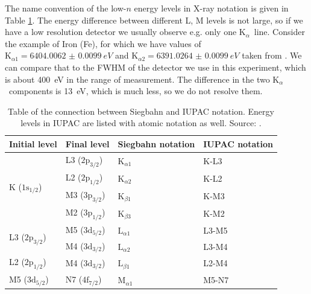 \documentclass[11pt,a4paper,twoside,onecolumn]{article}
\newcommand{\Kalpha}{$\mathrm{K}_\alpha$~}
\begin{document}
The name convention of the low-$n$ energy levels in X-ray notation is given in Table \ref{tab:siegbahn-notation}. The energy difference between different L, M levels is not large, so if we have a low resolution detector we usually observe e.g. only one \Kalpha line. Consider the example of Iron (Fe), for which we have values of $\mathrm{K}_{\alpha 1} = \qty{6404.0062(99)}{eV}$ and $\mathrm{K}_{\alpha 2} = \qty{6391.0264(99)}{eV}$ taken from \cite{Hudson2003}. We can compare that to the FWHM of the detector we use in this experiment, which is about \qty{400}{eV} in the range of measurement. The difference in the two \Kalpha components is \qty{13}{eV}, which is much less, so we do not resolve them.
\begin{table}[!htbp]
    \centering
    \begin{tabular}{@{}llll@{}}
    \toprule
    \multicolumn{1}{c}{Initial level} & \multicolumn{1}{c}{Final level} & \multicolumn{1}{c}{Siegbahn notation} & \multicolumn{1}{c}{IUPAC notation} \\ \midrule
    \multirow{4}{*}{K ($1\mathrm{s}_{1/2}$)}  & L3 ($2\mathrm{p}_{3/2}$) & $\mathrm{K}_{\alpha 1}$ & K-L3  \\
                                              & L2 ($2\mathrm{p}_{1/2}$) & $\mathrm{K}_{\alpha 2}$ & K-L2  \\
                                              & M3 ($3\mathrm{p}_{3/2}$) & $\mathrm{K}_{\beta 1}$  & K-M3  \\
                                              & M2 ($3\mathrm{p}_{1/2}$) & $\mathrm{K}_{\beta 3}$  & K-M2  \\
    \multirow{2}{*}{L3 ($2\mathrm{p}_{3/2}$)} & M5 ($3\mathrm{d}_{5/2}$) & $\mathrm{L}_{\alpha 1}$ & L3-M5 \\
                                              & M4 ($3\mathrm{d}_{3/2}$) & $\mathrm{L}_{\alpha 2}$ & L3-M4 \\
    L2 ($2\mathrm{p}_{1/2}$)                  & M4 ($3\mathrm{d}_{3/2}$) & $\mathrm{L}_{\beta 1}$  & L2-M4 \\
    M5 ($3\mathrm{d}_{5/2}$)                  & N7 ($4\mathrm{f}_{7/2}$) & $\mathrm{M}_{\alpha 1}$ & M5-N7 \\ \bottomrule
    \end{tabular}
    \caption{Table of the connection between Siegbahn and IUPAC notation. Energy levels in IUPAC are listed with atomic notation as well. Source: \cite{Jenkins1991}.}
    \label{tab:siegbahn-notation}
\end{table}
\end{document}
